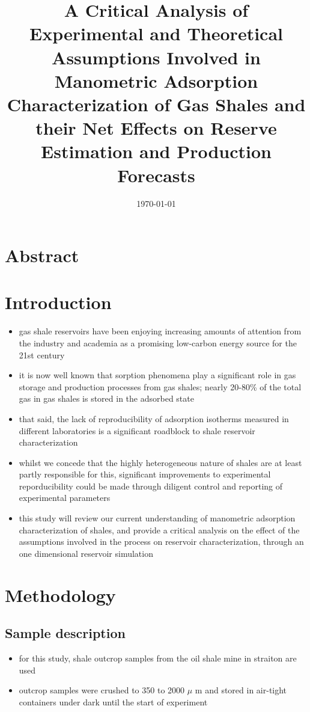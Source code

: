 \documentclass[11pt]{article}
\date{\today}
\title{A Critical Analysis of Experimental and Theoretical Assumptions Involved in Manometric Adsorption Characterization of Gas Shales and their Net Effects on Reserve Estimation and Production Forecasts}
\begin{document}
\maketitle
\tableofcontents


\section{Abstract}
\label{sec:orgec58a62}
\section{Introduction}
\label{sec:org1ab1a49}
\begin{itemize}
\item gas shale reservoirs have been enjoying increasing amounts of attention from the industry and academia as a promising low-carbon energy source for the 21st century
\item it is now well known that sorption phenomena play a significant role in gas storage and production processes from gas shales; nearly 20-80\% of the total gas in gas shales is stored in the adsorbed state \cite{schettlerjr1991}
\item that said, the lack of reproducibility of adsorption isotherms measured in different laboratories is a significant roadblock to shale reservoir characterization
\item whilst we concede that the highly heterogeneous nature of shales are at least partly responsible for this, significant improvements to experimental reporducibility could be made through diligent control and reporting of experimental parameters
\item this study will review our current understanding of manometric adsorption characterization of shales, and provide a critical analysis on the effect of the assumptions involved in the process on reservoir characterization, through an one dimensional reservoir simulation
\end{itemize}
\section{Methodology}
\label{sec:org23c0221}
\subsection{Sample description}
\label{sec:org47727f2}
\begin{itemize}
\item for this study, shale outcrop samples from the oil shale mine in straiton are used
\item outcrop samples were crushed to 350 to 2000 \(\mu\) m and stored in air-tight containers under dark until the start of experiment
\end{itemize}
\end{document}
